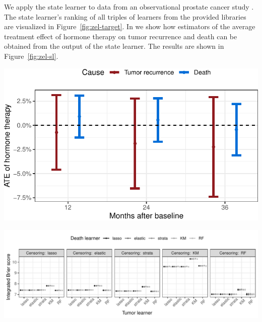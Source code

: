 \documentclass[a0,portrait]{a0poster}
\newcommand{\1}{\mathds{1}}
\begin{document}
\begin{minipage}{\textwidth}
\begin{minipage}[t]{1\linewidth}
\begin{multicols}{2}
\begin{multicols}{2}
  We apply the state learner to data from an observational prostate cancer study
  \cite{kattan2000pretreatment}. The state learner's ranking of all triples of
  learners from the provided libraries are visualized in
  Figure~\ref{fig:zel-target}. In \cite{munch2024} we show how estimators of the
  average treatment effect of hormone therapy on tumor recurrence and death can
  be obtained from the output of the state learner. The results are shown in
  Figure~\ref{fig:zel-sl}. \vfill\null \columnbreak
\begin{center}
  \includegraphics[width=1\linewidth]{zelefsky-data-target-par.pdf}
  \vspace{-12.3cm}
  \label{fig:zel-target}
\end{center}
  
\end{multicols}


\begin{center}
  \includegraphics[width=1\linewidth]{zelefski-real-data.pdf}
  \vspace{-13.5cm}
  \label{fig:zel-sl}
\end{center}



\end{multicols}
\end{minipage}
\end{minipage}
\end{document}

